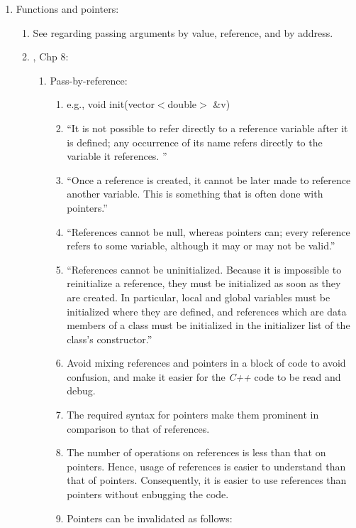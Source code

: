 \begin{enumerate}
\item Functions and pointers: \vspace{-0.3cm}
	\begin{enumerate} \itemsep -2pt
	\item See \cite[\S7.2-7.4]{Pomeranz2014} regarding passing arguments by value, reference, and by address.
	\item \cite{Stroustrup2014}, Chp 8: \vspace{-0.2cm}
		\begin{enumerate} \itemsep -2pt
		\item Pass-by-reference: \vspace{-0.1cm}
			\begin{enumerate} \itemsep -1pt
			\item e.g., void init(vector$<$double$>$ \&v)
			\item ``It is not possible to refer directly to a reference variable after it is defined; any occurrence of its name refers directly to the variable it references. ''
			\item ``Once a reference is created, it cannot be later made to reference another variable. This is something that is often done with pointers.''
			\item ``References cannot be null, whereas pointers can; every reference refers to some variable, although it may or may not be valid.''
			\item ``References cannot be uninitialized. Because it is impossible to reinitialize a reference, they must be initialized as soon as they are created. In particular, local and global variables must be initialized where they are defined, and references which are data members of a class must be initialized in the initializer list of the class's constructor.''
			\item Avoid mixing references and pointers in a block of code to avoid confusion, and make it easier for the {\it C++} code to be read and debug.
			\item The required syntax for pointers make them prominent in comparison to that of references.
			\item The number of operations on references is less than that on pointers. Hence, usage of references is easier to understand than that of pointers. Consequently, it is easier to use references than pointers without enbugging the code.
			\item Pointers can be invalidated as follows: \vspace{-0.1cm}

\end{enumerate}
\end{enumerate}
\end{enumerate}
\end{enumerate}
